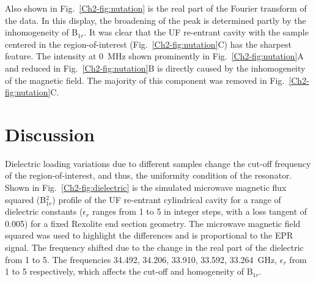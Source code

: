 Also shown in Fig.~\ref{Ch2-fig:nutation} is the real part of the Fourier transform of the data. In this display, the broadening of the peak is determined partly by the inhomogeneity of B$_{1r}$. \cite{pulsejeschke} It was clear that the UF re-entrant \cylTE{} cavity with the sample centered in the region-of-interest (Fig.~\ref{Ch2-fig:nutation}C) has the sharpest feature. The intensity at 0~MHz shown prominently in Fig.~\ref{Ch2-fig:nutation}A and reduced in Fig.~\ref{Ch2-fig:nutation}B is directly caused by the inhomogeneity of the magnetic field. The majority of this component was removed in Fig.~\ref{Ch2-fig:nutation}C. 

\section{Discussion}

Dielectric loading variations due to different samples change the cut-off frequency of the region-of-interest, and thus, the uniformity condition of the resonator. Shown in Fig.~\ref{Ch2-fig:dielectric} is the simulated microwave magnetic flux squared (B$^2_{1r}$) profile of the UF re-entrant cylindrical \cylTE{} cavity for a range of dielectric constants ($\epsilon_r$ ranges from 1 to 5 in integer steps, with a loss tangent of 0.005) for a fixed Rexolite end section geometry. The microwave magnetic field squared was used to highlight the differences and is proportional to the EPR signal. The frequency shifted due to the change in the real part of the dielectric from 1 to 5. The frequencies  34.492, 34.206, 33.910, 33.592, 33.264~GHz, $\epsilon_r$ from 1 to 5 respectively, which affects the cut-off and homogeneity of B$_{1r}$. 

